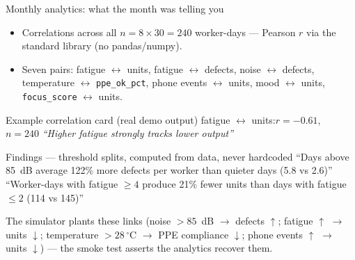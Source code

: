 \documentclass[aspectratio=169]{beamer}
\begin{document}
\begin{frame}{Monthly analytics: what the month was telling you}
  \begin{itemize}
    \item Correlations across all $n = 8 \times 30 = 240$ worker-days ---
          Pearson $r$ via the standard library (no pandas/numpy).
    \item Seven pairs: fatigue $\leftrightarrow$ units,
          fatigue $\leftrightarrow$ defects, noise $\leftrightarrow$ defects,
          temperature $\leftrightarrow$ \texttt{ppe\_ok\_pct},
          phone events $\leftrightarrow$ units, mood $\leftrightarrow$ units,
          \texttt{focus\_score} $\leftrightarrow$ units.
  \end{itemize}
  \begin{block}{Example correlation card (real demo output)}
    fatigue $\leftrightarrow$ units:\quad $r = -0.61$, $n = 240$ \quad
    \emph{``Higher fatigue strongly tracks lower output''}
  \end{block}
  \begin{block}{Findings --- threshold splits, computed from data, never hardcoded}
    ``Days above 85~dB average 122\% more defects per worker than quieter
    days (5.8 vs 2.6)''\\
    ``Worker-days with fatigue $\geq 4$ produce 21\% fewer units than days
    with fatigue $\leq 2$ (114 vs 145)''
  \end{block}
  {\small The simulator plants these links (noise $> 85$~dB $\rightarrow$
  defects $\uparrow$; fatigue $\uparrow$ $\rightarrow$ units $\downarrow$;
  temperature $> 28\,^{\circ}$C $\rightarrow$ PPE compliance $\downarrow$;
  phone events $\uparrow$ $\rightarrow$ units $\downarrow$) --- the smoke
  test asserts the analytics recover them.}
\end{frame}
\end{document}
